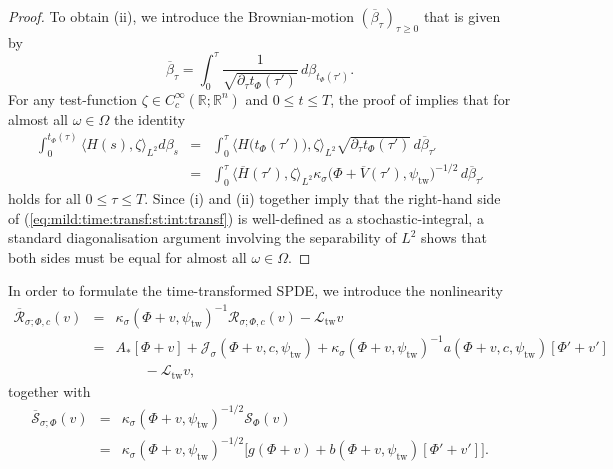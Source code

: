 \documentclass[10pt]{articleHJ}
\newcommand{\Real}{\mathbb{R}}							%
\newcommand{\sref}[1]{(\ref{#1})}                       %
\numberwithin{equation}{section}
\begin{document}
\begin{proof}
To obtain (ii),
we introduce the Brownian-motion $(\overline{\beta}_\tau)_{\tau \ge 0}$
that is given by
\begin{equation}
\overline{\beta}_\tau
= \int_0^\tau \frac{1}{\sqrt{\partial_\tau t_\Phi(\tau')}}
    \,   d \beta_{t_\Phi(\tau')} .
\end{equation}
For any test-function $\zeta \in C^\infty_c(\Real;\Real^n)$
and $0 \le t \le T$,
the proof of \cite[Lem. 5.1.3.5]{jeanblanc2009mathematical}
implies that for almost all $\omega \in \Omega$
the identity
\begin{equation}
\begin{array}{lcl}
\int_0^{t_\Phi(\tau) }
  \langle H(s) , \zeta \rangle_{L^2} d \beta_s
& = &
  \int_0^\tau
  \langle H\big(t_{\Phi}(\tau') \big) , \zeta \rangle_{L^2}
     \sqrt{\partial_\tau t_{\Phi}(\tau')}
     \, d \overline{\beta}_{\tau'}
\\[0.2cm]
& = &
  \int_0^\tau
  \langle \overline{H}(\tau')  , \zeta \rangle_{L^2}
     \kappa_{\sigma}\big(\Phi+ \overline{V}(\tau') , \psi_{\mathrm{tw}} \big)^{-1/2}
     \, d \overline{\beta}_{\tau'}
\end{array}
\end{equation}
holds for all $0 \le \tau \le T$.
Since (i) and (ii) together imply that the right-hand side
of \sref{eq:mild:time:transf:st:int:transf} is well-defined
as a stochastic-integral,
a standard diagonalisation argument involving
the separability of $L^2$
shows that both sides must be equal
for almost all $\omega \in \Omega$.
\end{proof}



In order to formulate the time-transformed SPDE,
we introduce the nonlinearity
\begin{equation}
\label{eq:md:overline:r:sigma}
\begin{array}{lcl}
\overline{\mathcal{R}}_{\sigma;\Phi, c}
(v)
& = &
  \kappa_{\sigma}(\Phi + v , \psi_{\mathrm{tw}})^{-1}
    \mathcal{R}_{\sigma;\Phi,c}(v)
  - \mathcal{L}_{\mathrm{tw}} v
\\[0.2cm]
& = & A_* [\Phi + v]
+ \mathcal{J}_{\sigma}(\Phi + v,
c , \psi_{\mathrm{tw}} )
+ \kappa_{\sigma}(\Phi + v,\psi_{\mathrm{tw}})^{-1}
a(\Phi + v , c, \psi_{\mathrm{tw}})
[\Phi' + v']
\\[0.2cm]
& & \qquad
  - \mathcal{L}_{\mathrm{tw}} v,
\end{array}
\end{equation}
together with
\begin{equation}
\label{eq:md:overline:s:sigma}
\begin{array}{lcl}
\overline{\mathcal{S}}_{\sigma; \Phi}(v)
& = &
\kappa_{\sigma}(\Phi + v,\psi_{\mathrm{tw}})^{-1/2}
\mathcal{S}_{\Phi}(v)
\\[0.2cm]
& = &
\kappa_{\sigma}(\Phi + v,\psi_{\mathrm{tw}})^{-1/2}
\Big[
  g(\Phi + v)
    + b(\Phi + v, \psi_{\mathrm{tw}})[\Phi' + v']
\Big] .
\\[0.2cm]
\end{array}
\end{equation}
\end{document}
